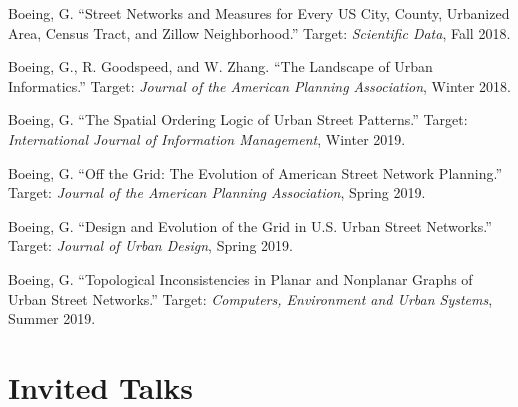 \documentclass[12pt,letterpaper]{report}
\begin{document}
\begin{tablist}

\item[\the\year] \tab Boeing, G. \enquote{Street Networks and Measures for Every US City, County, Urbanized Area, Census Tract, and Zillow Neighborhood.} Target: \textit{Scientific Data}, Fall 2018.

\item[\the\year] \tab Boeing, G., R. Goodspeed, and W. Zhang. \enquote{The Landscape of Urban Informatics.} Target: \textit{Journal of the American Planning Association}, Winter 2018.

\item[\the\year] \tab Boeing, G. \enquote{The Spatial Ordering Logic of Urban Street Patterns.} Target: \textit{International Journal of Information Management}, Winter 2019.

\item[\the\year] \tab Boeing, G. \enquote{Off the Grid: The Evolution of American Street Network Planning.} Target: \textit{Journal of the American Planning Association}, Spring 2019.

\item[\the\year] \tab Boeing, G. \enquote{Design and Evolution of the Grid in U.S. Urban Street Networks.} Target: \textit{Journal of Urban Design}, Spring 2019.

\item[\the\year] \tab Boeing, G. \enquote{Topological Inconsistencies in Planar and Nonplanar Graphs of Urban Street Networks.} Target: \textit{Computers, Environment and Urban Systems}, Summer 2019.

\end{tablist}



\section*{Invited Talks}
\end{document}

